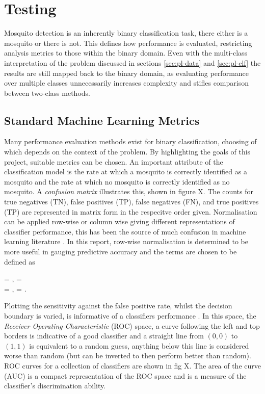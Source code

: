 \section{Testing}
\label{sec:pl-test}
    Mosquito detection is an inherently binary classification task, there either is a mosquito or there is not. This defines how performance is evaluated, restricting analysis metrics to those within the binary domain. Even with the multi-class interpretation of the problem discussed in sections \ref{sec:pl-data} and \ref{sec:pl-clf} the results are still mapped back to the binary domain, as evaluating performance over multiple classes unnecessarily increases complexity and stifles comparison between two-class methods.
    \subsection{Standard Machine Learning Metrics}
    \label{subsec:pl-test-stan}
        Many performance evaluation methods exist for binary classification, choosing of which depends on the context of the problem. By highlighting the goals of this project, suitable metrics can be chosen. An important attribute of the classification model is the rate at which a mosquito is correctly identified as a mosquito and the rate at which no mosquito is correctly identified as no mosquito. A \textit{confusion matrix} illustrates this, shown in figure X. The counts for true negatives (TN), false positives (TP), false negatives (FN), and true positives (TP) are represented in matrix form in the respecitve order given. Normalisation can be applied row-wise or column wise giving different representations of classifier performance, this has been the source of much confusion in machine learning literature \cite{Gambino2006}. In this report, row-wise normalisation is determined to be more useful in gauging predictive accuracy and the terms are chosen to be defined as
        \begin{tgather}
            \footnotesize{} = ,  = \\
            \footnotesize{} = ,  = .
        \end{tgather}
        Plotting the sensitivity against the false positive rate, whilst the decision boundary is varied, is informative of a classifiers performance \cite{Fawcett2005}. In this space, the \textit{Receiver Operating Characteristic} (ROC) space, a curve following the left and top borders is indicative of a good classifier and a straight line from $(0,0)$ to $(1,1)$ is equivalent to a random guess, anything below this line is considered worse than random (but can be inverted to then perform better than random). ROC curves for a collection of classifiers are shown in fig X. The area of the curve (AUC) is a compact representation of the ROC space and is a measure of the classifier's discrimination ability.
        
